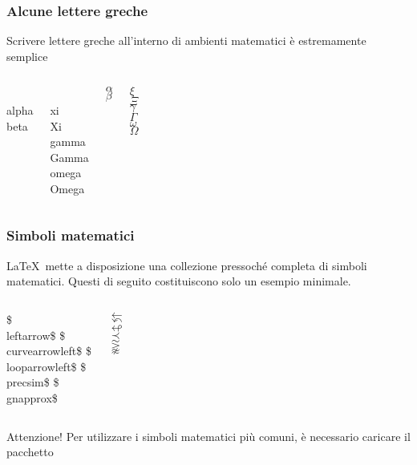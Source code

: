 \begin{frame}
  \frametitle{Alcune lettere greche}
	Scrivere lettere greche all'interno di ambienti matematici \`e estremamente semplice
	\begin{columns}
		\begin{LaTeXcode}
			\\alpha\n
			\\beta
		\end{LaTeXcode}
		\begin{LaTeXcode}
			\\xi\n
			\\Xi\n
			\\gamma\n
			\\Gamma\n
			\\omega\n
			\\Omega
		\end{LaTeXcode}
	  \column[t]{.3\textwidth}
		\begin{LaTeXoutput}
			$\alpha$\\
			$\beta$
		\end{LaTeXoutput}
		\begin{LaTeXoutput}
			$\xi$\\
			$\Xi$\\
			$\gamma$\\
			$\Gamma$\\
			$\omega$\\
			$\Omega$
		\end{LaTeXoutput}
	\end{columns}
\end{frame}
\begin{frame}
  \frametitle{Simboli matematici}
	\LaTeX\ mette a disposizione una collezione pressoch\'e completa di simboli matematici. Questi di seguito costituiscono solo un esempio minimale.
  \begin{columns}
	\begin{LaTeXcode}
		\$\\leftarrow\$\n
		\$\\curvearrowleft\$\n
		\$\\looparrowleft\$\n
		\$\\precsim\$\n
		\$\\gnapprox\$
	\end{LaTeXcode}
	\begin{LaTeXoutput}
		$\leftarrow$\\[.1ex]
		$\curvearrowleft$\\[.1ex]
		$\looparrowleft$\\[.1ex]
		$\precsim$\\[.1ex]
		$\gnapprox$
	\end{LaTeXoutput}
  \end{columns}
	\begin{block}{Attenzione!}
	Per utilizzare i simboli matematici pi\`u comuni, \`e necessario caricare il pacchetto 
	\end{block}
\end{frame}
